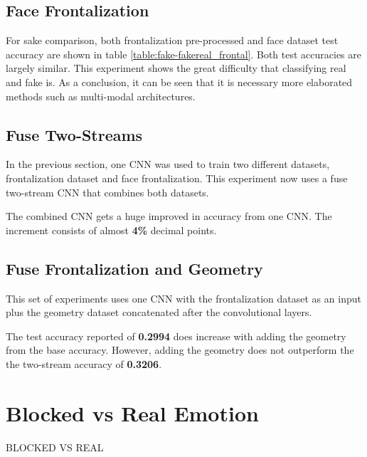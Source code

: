 \subsection{Face Frontalization}

For sake comparison, both frontalization pre-processed and face dataset test accuracy are shown in table \ref{table:fake-fakereal_frontal}. Both test accuracies are largely similar. This experiment shows the great difficulty that classifying real and fake is. As a conclusion, it can be seen that it is necessary more elaborated methods such as multi-modal architectures.



\subsection{Fuse Two-Streams}
In the previous section, one CNN was used to train two different datasets, frontalization dataset and face frontalization. This experiment now uses a fuse two-stream CNN that combines both datasets.



The combined CNN gets a huge improved in accuracy from one CNN. The increment consists of almost \textbf{4\%} decimal points.

\subsection{Fuse Frontalization and Geometry}
This set of experiments uses one CNN with the frontalization dataset as an input plus the geometry dataset concatenated after the convolutional layers.



The test accuracy reported of \textbf{0.2994} does increase with adding the geometry from the base accuracy. However, adding the geometry does not outperform the the two-stream accuracy of \textbf{0.3206}.

\section{Blocked vs Real Emotion}

BLOCKED VS REAL